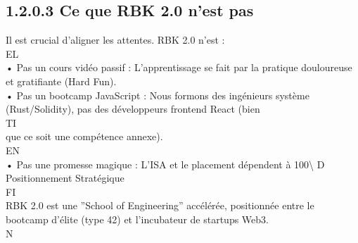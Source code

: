 \documentclass[12pt,landscape,a4paper]{article}
\begin{document}
\subsection{1.2.0.3 Ce que RBK 2.0 n’est pas}
\vspace{0.5em}
Il est crucial d’aligner les attentes. RBK 2.0 n’est :\\
\vspace{0.5em}
\vspace{0.5em}
\vspace{0.5em}
\vspace{0.5em}
EL\\
• Pas un cours vidéo passif : L’apprentissage se fait par la pratique douloureuse et gratifiante (Hard Fun).\\
\vspace{0.5em}
• Pas un bootcamp JavaScript : Nous formons des ingénieurs système (Rust/Solidity), pas des développeurs frontend React (bien\\
\vspace{0.5em}
\vspace{0.5em}
\vspace{0.5em}
\vspace{0.5em}
TI\\
que ce soit une compétence annexe).\\
\vspace{0.5em}
\vspace{0.5em}
\vspace{0.5em}
\vspace{0.5em}
EN\\
• Pas une promesse magique : L’ISA et le placement dépendent à 100\textbackslash{}%
\vspace{0.5em}
\vspace{0.5em}
\vspace{0.5em}
\vspace{0.5em}
D\\
Positionnement Stratégique\\
\vspace{0.5em}
\vspace{0.5em}
\vspace{0.5em}
\vspace{0.5em}
FI\\
RBK 2.0 est une ”School of Engineering” accélérée, positionnée entre le bootcamp d’élite (type 42) et l’incubateur de startups Web3.\\
\vspace{0.5em}
N\\
\end{document}

